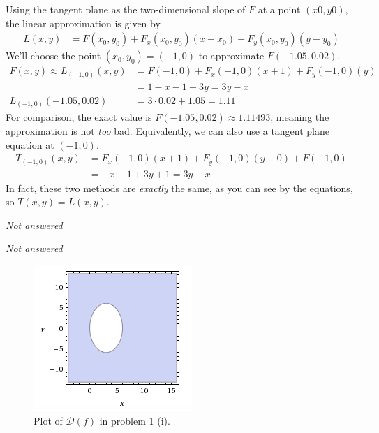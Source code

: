 \documentclass[a4paper,norsk,12pt]{article}
\begin{document}
Using the tangent plane as the two-dimensional slope of $F$ at a point $(x0,
y0)$, the linear approximation is given by
\begin{align*}
  L(x,y) &= F(x_0, y_0) + F_x(x_0, y_0)(x-x_0) + F_y(x_0, y_0)(y-y_0)
\end{align*}
We'll choose the point $(x_0, y_0) = (-1, 0)$ to approximate $F(-1.05, 0.02)$.
\begin{align*}
  F(x,y) \approx
  L_{(-1,0)}(x,y)
    &= F(-1,0) + F_x(-1,0)(x+1) + F_y(-1,0)(y) \\
    &= 1 - x - 1 + 3y = 3y-x \\
  L_{(-1,0)}(-1.05, 0.02)
    &= 3\cdot0.02 + 1.05 = 1.11
\end{align*}
For comparison, the exact value is $F(-1.05, 0.02) \approx 1.11493$, meaning
the approximation is not \textit{too} bad.
Equivalently, we can also use a tangent plane equation at $(-1,0)$.
\begin{align*}
  T_{(-1,0)}(x,y)
    &= F_x(-1,0)(x+1) + F_y(-1,0)(y-0) + F(-1,0)\\
    &= -x-1 + 3y + 1 = 3y-x
\end{align*}
In fact, these two methods are \textit{exactly} the same, as you can see by the
equations, so $T(x,y) = L(x,y)$.

\textit{Not answered}

\textit{Not answered}

\begin{figure}[h]
  \centering
  \includegraphics{ob1plot.png}
  \caption{Plot of $\mathcal{D}(f)$ in problem 1 (i).}
  \label{plot.p1}
\end{figure}
\end{document}
